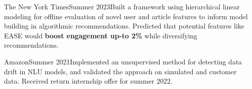   {The New York Times}{Summer 2023}{}{Built a framework using hierarchical linear modeling for offline evaluation of novel user and article features to inform model building in algorithmic recommendations. Predicted that potential features like EASE would \textbf{boost engagement up-to 2\%} while diversifying recommendations.}


  {Amazon}{Summer 2021}{}{Implemented an unsupervised method for detecting data drift in NLU models, and validated the approach on simulated and customer data. Received return internship offer for summer 2022.}
